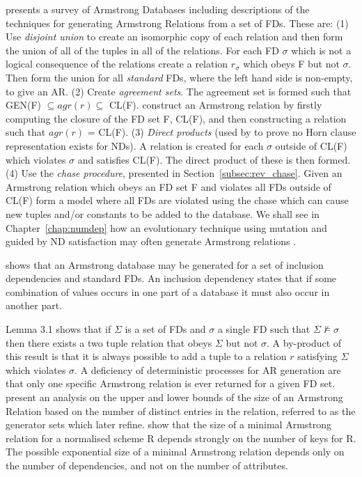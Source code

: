 \medskip

\cite{fag82} presents a survey of Armstrong Databases  including
descriptions of the techniques for generating Armstrong Relations from
a set of FDs.  
These are: (1) Use {\em disjoint union } to create an isomorphic copy of each
relation and then form the union of all of the tuples in all of the
relations. For each FD $\sigma$ which is not a logical consequence of
the relations create a relation $r_\sigma$ which obeys F but not
$\sigma$. Then form the union for all {\em standard} FDs, where the
left hand side is non-empty, to give an
AR.  (2) Create {\em agreement
sets}. The agreement set is formed such that
GEN(F) $\subseteq agr(r) \subseteq$ CL(F). \cite{bdfs84} construct
an Armstrong relation by firstly computing the closure of the FD set
F, CL(F), and then constructing a relation such that $agr(r)$ =
CL(F). (3) {\em Direct
products }(used by \cite{gm85a} to prove no Horn clause
representation exists for NDs). A relation is created for each $\sigma$ outside
of CL(F) which violates $\sigma$ and satisfies CL(F). The direct
product of these is then formed. (4) Use the {\em chase procedure},
presented in Section~\ref{subsec:rev_chase}. Given
an Armstrong relation which obeys an FD set
F and violates all FDs outside of CL(F) form a model where all
FDs are violated using the chase which can cause new tuples and/or
constants to be added to the database. We shall see in
Chapter~\ref{chap:numdep} how an evolutionary technique using mutation
and guided by ND
satisfaction may often generate Armstrong relations \cite{cl96,cl98c}.

\medskip

\cite{fv83} shows that an Armstrong database may be generated for a
set of inclusion  
dependencies and standard FDs.  An inclusion dependency
states that if some combination of values occurs in one part of a
database it  must also occur in another part.  
\medskip

Lemma 3.1 \cite{bdfs84} shows that if $\Sigma$ is a set of FDs and $\sigma$ a
single FD such that $\Sigma \not\models \sigma$ then there exists a two tuple
relation that obeys $\Sigma$ but not $\sigma$.  A by-product of this result is
that it is always possible to add a tuple to a relation $r$ satisfying
$\Sigma$ which
violates $\sigma$.  A deficiency of deterministic processes for AR
generation are that
only one specific Armstrong relation is ever returned for a given FD
set. \cite{bdfs84} present an analysis on the upper and lower bounds of the
size of an Armstrong Relation based on the number of distinct entries 
in the relation, referred to as the generator sets which \cite{mr86} 
later refine. 
\cite{mr86} show that the size of a minimal Armstrong relation for a
normalised  scheme R depends strongly on the number of keys for R.
The possible exponential size of a minimal Armstrong relation depends
only on the number of dependencies, and not on the number of attributes. 

